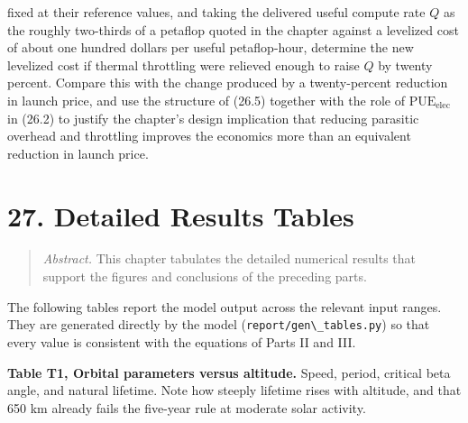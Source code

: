 \documentclass[
  11pt,
  openany,
  oneside]{book}
\newcommand{\passthrough}[1]{#1}
\begin{document}
\begin{enumerate}
  fixed at their reference values, and taking the delivered useful
  compute rate \(Q\) as the roughly two-thirds of a petaflop quoted in
  the chapter against a levelized cost of about one hundred dollars per
  useful petaflop-hour, determine the new levelized cost if thermal
  throttling were relieved enough to raise \(Q\) by twenty percent.
  Compare this with the change produced by a twenty-percent reduction in
  launch price, and use the structure of (26.5) together with the role
  of \(\mathrm{PUE}_{\text{elec}}\) in (26.2) to justify the chapter's
  design implication that reducing parasitic overhead and throttling
  improves the economics more than an equivalent reduction in launch
  price.
\end{enumerate}

\chapter{27. Detailed Results Tables}\label{detailed-results-tables}

\begin{quote}
\emph{Abstract.} This chapter tabulates the detailed numerical results
that support the figures and conclusions of the preceding parts.
\end{quote}

The following tables report the model output across the relevant input
ranges. They are generated directly by the model
(\passthrough{\lstinline!report/gen\_tables.py!}) so that every value is
consistent with the equations of Parts II and III.

\textbf{Table T1, Orbital parameters versus altitude.} Speed, period,
critical beta angle, and natural lifetime. Note how steeply lifetime
rises with altitude, and that 650 km already fails the five-year rule at
moderate solar activity.
\end{document}
